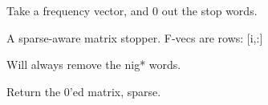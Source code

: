 
\begin{fulllineitems}
\label{labMTsimple:labMTsimple.storyLab.stopper_mat}
Take a frequency vector, and 0 out the stop words.

A sparse-aware matrix stopper.
F-vecs are rows: {[}i,:{]}

Will always remove the nig* words.

Return the 0'ed matrix, sparse.

\end{fulllineitems}

